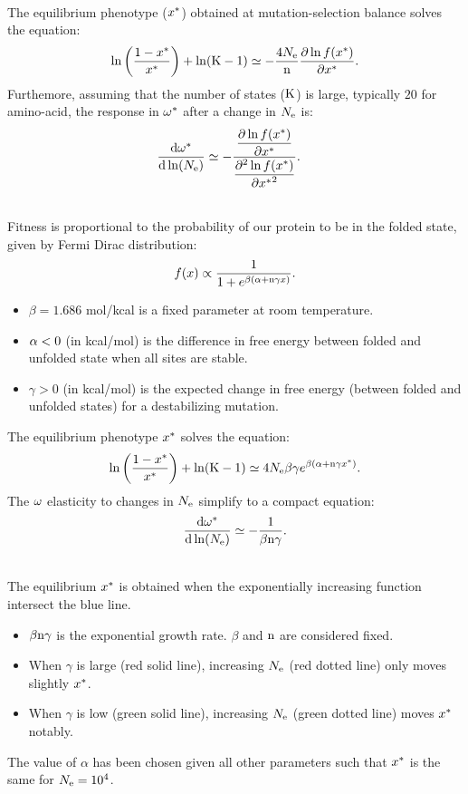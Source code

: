 \documentclass{article}
\begin{document}
~\\
The equilibrium phenotype ($x^{*}$)	obtained at mutation-selection balance solves the equation:
\begin{align}
\ln \left( \frac{1 - x^{*}}{x^{*}} \right) + \ln (\text{K}-1) \simeq - \frac{4N_{\mathrm{e}}}{\text{n}} \frac{ \partial \ln f(x^{*}) }{\partial {x^{*}}}.
\end{align}
Furthemore, assuming that the number of states ($\text{K}$) is large, typically $20$ for amino-acid, the response in $\omega^{*}$ after a change in $N_{\mathrm{e}}$ is: 
\begin{align}
\frac{ \mathrm{d} \omega^{*}}{\mathrm{d} \ln (N_{\mathrm{e}})} & \simeq - \dfrac{\dfrac{ \partial \ln f(x^{*}) }{\partial {x^{*}}}}{\dfrac{ \partial^2 \ln f(x^{*}) }{\partial {x^{*}}^2}}.
\end{align}


\newpage
~\\
Fitness is proportional to the probability of our protein to be in the folded state, given by Fermi Dirac distribution: 
\begin{equation}
f(x) \propto \dfrac{1}{1 + e^{\beta (\alpha + \text{n} \gamma x)}}.
\end{equation}
\begin{itemize}
	\setlength\itemsep{-0.1em}
	\item $\beta=1.686$ mol/kcal is a fixed parameter at room temperature.
	\item $\alpha < 0$ (in kcal/mol) is the difference in free energy between folded and unfolded state when all sites are stable.
	\item $\gamma > 0$ (in kcal/mol) is the expected change in free energy (between folded and unfolded states) for a destabilizing mutation.
\end{itemize}
The equilibrium phenotype $x^{*}$ solves the equation: 
\begin{align}
\ln \left( \frac{1 - x^{*}}{x^{*}} \right) + \ln (\text{K}-1) \simeq 4N_{\mathrm{e}} \beta \gamma e^{\beta (\alpha + \text{n} \gamma x^{*})}.
\label{eq:equilibrium}
\end{align}
The $\omega$ elasticity to changes in $N_{\mathrm{e}}$ simplify to a compact equation: 
\begin{equation}
\frac{ \mathrm{d} \omega^{*}}{\mathrm{d} \ln (N_{\mathrm{e}})} \simeq -\dfrac{1}{\beta \text{n} \gamma}.
\end{equation}

\newpage
~\\
The equilibrium $x^{*}$ is obtained when the exponentially increasing function intersect the blue line. 
\begin{itemize}
	\setlength\itemsep{-0.1em}
	\item $\beta \text{n} \gamma$ is the exponential growth rate. $\beta$ and $ \text{n}$
	are considered fixed.
	\item When $\gamma$ is large (red solid line), increasing $N_{\mathrm{e}}$ (red dotted line) only moves slightly $x^{*}$.
	\item When $\gamma$ is low (green solid line), increasing $N_{\mathrm{e}}$ (green dotted line) moves $x^{*}$ notably.
\end{itemize}
The value of $\alpha$ has been chosen given all other parameters such that $x^{*}$ is the same for $N_{\mathrm{e}}=10^4$.\\
\end{document}
